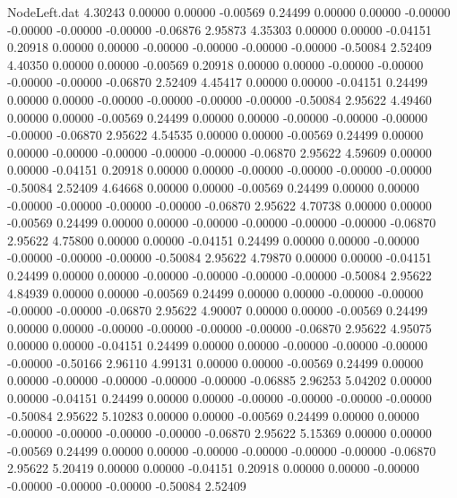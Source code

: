 \begin{filecontents}{NodeLeft.dat}
   4.30243    0.00000    0.00000    -0.00569    0.24499    0.00000    0.00000   -0.00000   -0.00000   -0.00000   -0.00000   -0.06876    2.95873
   4.35303    0.00000    0.00000    -0.04151    0.20918    0.00000    0.00000   -0.00000   -0.00000   -0.00000   -0.00000   -0.50084    2.52409
   4.40350    0.00000    0.00000    -0.00569    0.20918    0.00000    0.00000   -0.00000   -0.00000   -0.00000   -0.00000   -0.06870    2.52409
   4.45417    0.00000    0.00000    -0.04151    0.24499    0.00000    0.00000   -0.00000   -0.00000   -0.00000   -0.00000   -0.50084    2.95622
   4.49460    0.00000    0.00000    -0.00569    0.24499    0.00000    0.00000   -0.00000   -0.00000   -0.00000   -0.00000   -0.06870    2.95622
   4.54535    0.00000    0.00000    -0.00569    0.24499    0.00000    0.00000   -0.00000   -0.00000   -0.00000   -0.00000   -0.06870    2.95622
   4.59609    0.00000    0.00000    -0.04151    0.20918    0.00000    0.00000   -0.00000   -0.00000   -0.00000   -0.00000   -0.50084    2.52409
   4.64668    0.00000    0.00000    -0.00569    0.24499    0.00000    0.00000   -0.00000   -0.00000   -0.00000   -0.00000   -0.06870    2.95622
   4.70738    0.00000    0.00000    -0.00569    0.24499    0.00000    0.00000   -0.00000   -0.00000   -0.00000   -0.00000   -0.06870    2.95622
   4.75800    0.00000    0.00000    -0.04151    0.24499    0.00000    0.00000   -0.00000   -0.00000   -0.00000   -0.00000   -0.50084    2.95622
   4.79870    0.00000    0.00000    -0.04151    0.24499    0.00000    0.00000   -0.00000   -0.00000   -0.00000   -0.00000   -0.50084    2.95622
   4.84939    0.00000    0.00000    -0.00569    0.24499    0.00000    0.00000   -0.00000   -0.00000   -0.00000   -0.00000   -0.06870    2.95622
   4.90007    0.00000    0.00000    -0.00569    0.24499    0.00000    0.00000   -0.00000   -0.00000   -0.00000   -0.00000   -0.06870    2.95622
   4.95075    0.00000    0.00000    -0.04151    0.24499    0.00000    0.00000   -0.00000   -0.00000   -0.00000   -0.00000   -0.50166    2.96110
   4.99131    0.00000    0.00000    -0.00569    0.24499    0.00000    0.00000   -0.00000   -0.00000   -0.00000   -0.00000   -0.06885    2.96253
   5.04202    0.00000    0.00000    -0.04151    0.24499    0.00000    0.00000   -0.00000   -0.00000   -0.00000   -0.00000   -0.50084    2.95622
   5.10283    0.00000    0.00000    -0.00569    0.24499    0.00000    0.00000   -0.00000   -0.00000   -0.00000   -0.00000   -0.06870    2.95622
   5.15369    0.00000    0.00000    -0.00569    0.24499    0.00000    0.00000   -0.00000   -0.00000   -0.00000   -0.00000   -0.06870    2.95622
   5.20419    0.00000    0.00000    -0.04151    0.20918    0.00000    0.00000   -0.00000   -0.00000   -0.00000   -0.00000   -0.50084    2.52409

\end{filecontents}
